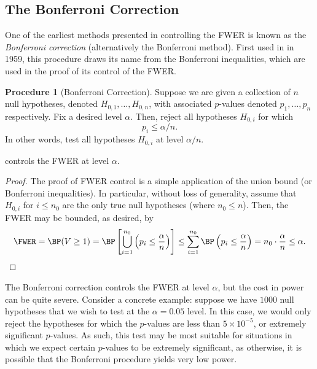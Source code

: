 \documentclass[11pt,reqno]{report}
\theoremstyle{definition}
\newtheorem{proc}[theorem]{Procedure}
\numberwithin{equation}{section}
\begin{document}
\subsection{The Bonferroni Correction}
One of the earliest methods presented in controlling the FWER is known as the \emph{Bonferroni correction} (alternatively the Bonferroni method). First used in \cite{dunn} in 1959, this procedure draws its name from the Bonferroni inequalities, which are used in the proof of its control of the FWER.
\begin{proc}[Bonferroni Correction]
\label{bonfcorr}
Suppose we are given a collection of $n$ null hypotheses, denoted $H_{0, 1}, \ldots, H_{0, n}$, with associated $p$-values denoted $p_1, \ldots, p_n$ respectively. Fix a desired level $\alpha$. Then, reject all hypotheses $H_{0, i}$ for which
\begin{equation}
p_i \leq \alpha / n.
\end{equation} In other words, test all hypotheses $H_{0, i}$ at level $\alpha / n$.
\end{proc}
\begin{prop}
 controls the FWER at level $\alpha$.
\end{prop}
\begin{proof}
The proof of FWER control is a simple application of the union bound (or Bonferroni inequalities). In particular, without loss of generality, assume that $H_{0,i}$ for $i \leq n_0$ are the only true null hypotheses (where $n_0 \leq n$). Then, the FWER may be bounded, as desired, by
\begin{equation}
\FWER = \BP(V \geq 1) = \BP \left[ \bigcup_{i=1}^{n_0} \left( p_i \leq \frac{\alpha}{n} \right) \right] \leq \sum_{i=1}^{n_0} \BP\left( p_i \leq \frac{\alpha}{n}  \right) = n_0 \cdot \frac{\alpha}{n} \leq \alpha.
\end{equation}
\end{proof}
The Bonferroni correction controls the FWER at level $\alpha$, but the cost in power can be quite severe. Consider a concrete example: suppose we have $1000$ null hypotheses that we wish to test at the $\alpha = 0.05$ level. In this case, we would only reject the hypotheses for which the $p$-values are less than $5 \times 10^{-5}$, or extremely significant $p$-values. As such, this test may be most suitable for situations in which we expect certain $p$-values to be extremely significant, as otherwise, it is possible that the Bonferroni procedure yields very low power.
\end{document}
